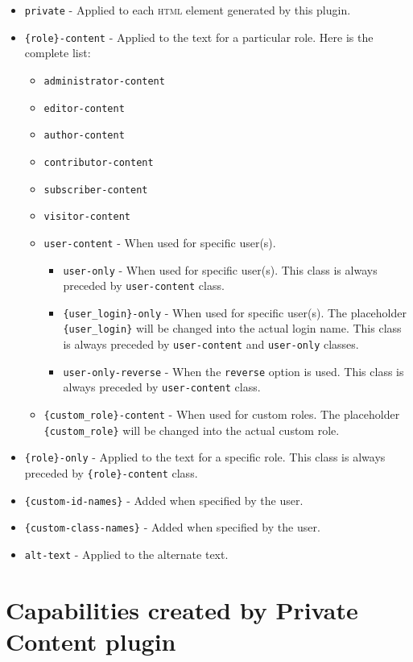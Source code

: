 \documentclass[a4paper,11pt]{article}
\begin{document}
\begin{itemize}
 \item \verb+private+ - Applied to each \textsc{html} element generated by this plugin.
 \item \verb+{role}-content+ - Applied to the text for a particular role. Here is the complete list:
 \begin{itemize}
  \item \verb+administrator-content+
  \item \verb+editor-content+
  \item \verb+author-content+
  \item \verb+contributor-content+
  \item \verb+subscriber-content+
  \item \verb+visitor-content+
  \item \verb+user-content+ - When used for specific user(s).
  \begin{itemize}
   \item \verb+user-only+ - When used for specific user(s). This class is always preceded by \verb+user-content+ class.
    \item \verb+{user_login}-only+ - When used for specific user(s). The placeholder \verb+{user_login}+ will be changed into the actual login name. This class is always preceded by \verb+user-content+ and \verb+user-only+ classes.
    \item \verb+user-only-reverse+ - When the \verb+reverse+ option is used. This class is always preceded by \verb+user-content+ class.
  \end{itemize}
  \item \verb+{custom_role}-content+ - When used for custom roles. The placeholder \verb+{custom_role}+ will be changed into the actual custom role.
  \end{itemize}
 \item \verb+{role}-only+ - Applied to the text for a specific role. This class is always preceded by \verb+{role}-content+ class.
 \item \verb+{custom-id-names}+ - Added when specified by the user.
 \item \verb+{custom-class-names}+ - Added when specified by the user.
 \item \verb+alt-text+ - Applied to the alternate text.
\end{itemize}

\section{Capabilities created by Private Content plugin}
\end{document}
